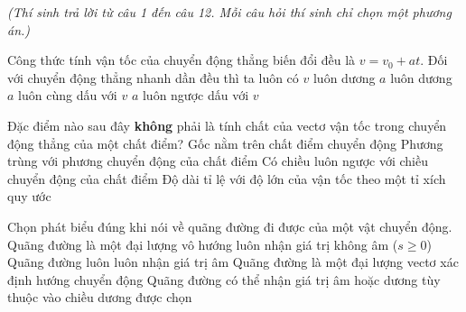 
\vspace{0.15cm}
\begin{flushleft}
	{\color{blue!50!green}}
	\textit{\small (Thí sinh trả lời từ câu 1 đến câu 12. Mỗi câu hỏi thí sinh chỉ chọn một phương án.)}
\end{flushleft}
\setcounter{ex}{0}
\setcounter{bt}{0}

\begin{ex}
	Công thức tính vận tốc của chuyển động thẳng biến đổi đều là $v = v_0 + at$. Đối với chuyển động thẳng nhanh dần đều thì ta luôn có
	\choice
	{$v$ luôn dương}
	{$a$ luôn dương}
	{\True $a$ luôn cùng dấu với $v$}
	{$a$ luôn ngược dấu với $v$}
\end{ex}

\begin{ex}
	Đặc điểm nào sau đây \textbf{không} phải là tính chất của vectơ vận tốc trong chuyển động thẳng của một chất điểm?
	\choice
	{Gốc nằm trên chất điểm chuyển động}
	{Phương trùng với phương chuyển động của chất điểm}
	{\True Có chiều luôn ngược với chiều chuyển động của chất điểm}
	{Độ dài tỉ lệ với độ lớn của vận tốc theo một tỉ xích quy ước}
\end{ex}

\begin{ex}
	Chọn phát biểu đúng khi nói về quãng đường đi được của một vật chuyển động.
	\choice
	{\True Quãng đường là một đại lượng vô hướng luôn nhận giá trị không âm ($s \ge 0$)}
	{Quãng đường luôn luôn nhận giá trị âm}
	{Quãng đường là một đại lượng vectơ xác định hướng chuyển động}
	{Quãng đường có thể nhận giá trị âm hoặc dương tùy thuộc vào chiều dương được chọn}
\end{ex}

